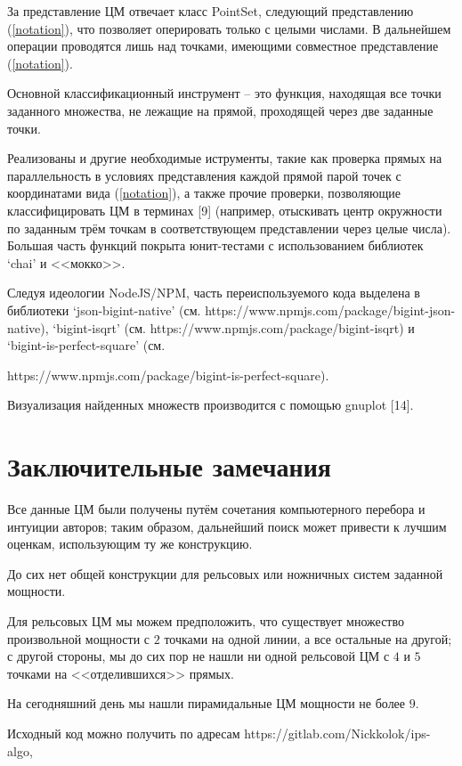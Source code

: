 \documentclass[12pt]{article}
\begin{document}
За представление ЦМ отвечает класс PointSet, следующий представлению (\ref{notation}), что позволяет оперировать только с целыми числами.
В дальнейшем операции проводятся лишь над точками, имеющими совместное представление (\ref{notation}).

Основной классификационный инструмент -- это функция, находящая все точки заданного множества, не лежащие на прямой, проходящей через две заданные точки.

Реализованы и другие необходимые иструменты, такие как проверка прямых на параллельность в условиях представления каждой прямой парой точек
с координатами вида (\ref{notation}), а также прочие проверки, позволяющие классифицировать ЦМ в терминах [9]
(например, отыскивать центр окружности по заданным трём точкам в соответствующем представлении через целые числа).
Большая часть функций покрыта юнит-тестами с использованием библиотек ‘chai’ и
<<мокко>>.

Следуя идеологии NodeJS/NPM, часть переиспользуемого кода выделена в библиотеки
‘json-bigint-native’ (см. https://www.npmjs.com/package/bigint-json-native), ‘bigint-isqrt’ (см. https://www.npmjs.com/package/bigint-isqrt)
и ‘bigint-is-perfect-square’ (см.

\noindent https://www.npmjs.com/package/bigint-is-perfect-square).

Визуализация найденных множеств производится с помощью gnuplot [14].


\section{Заключительные замечания}

Все данные ЦМ были получены путём сочетания компьютерного перебора и интуиции авторов;
таким образом, дальнейший поиск может привести к лучшим оценкам, использующим ту же
конструкцию.

До сих нет общей конструкции для рельсовых или ножничных систем заданной мощности.

Для рельсовых ЦМ мы можем предположить, что существует множество произвольной мощности с $2$ точками на одной линии, а все остальные на другой; с другой стороны,
мы до сих пор не нашли ни одной рельсовой ЦМ с $4$ и $5$ точками на <<отделившихся>> прямых.

На сегодняшний день мы нашли пирамидальные ЦМ мощности не более $9$.

Исходный код можно получить по адресам https://gitlab.com/Nickkolok/ips-algo,
\end{document}
